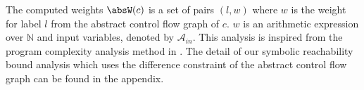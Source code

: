 %
The computed weights $\absW(c)$ is
a set of pairs 
$(l, w)$ where 
$w$ is the weight 
for label $l$ from the abstract control flow graph of $c$.
$w$ is an arithmetic  expression over $\mathbb{N}$ and
input variables, denoted by $\mathcal{A}_{in}$.
This analysis is  inspired from the program complexity analysis method in \cite{sinn2017complexity}.
The detail of our symbolic reachability bound analysis which uses the difference constraint of the abstract control flow graph can be found in the appendix.
%
%
